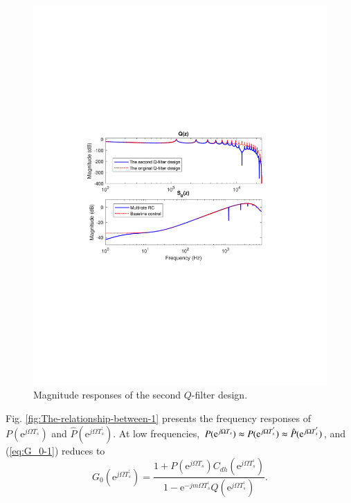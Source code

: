 \documentclass [11pt, proquest] {uwthesis}[2020/02/24]
\begin{document}
\begin{figure}[!ht]
\begin{centering}
\includegraphics[width=12cm]{Fractional-order-RC/Q_S_another_Q}
\par\end{centering}
\caption{\label{fig:Magnitude-responses-of}Magnitude responses of the second
$Q$-filter design.}
\end{figure}
Fig. \ref{fig:The-relationship-between-1} presents the frequency
responses of $P(\text{e}^{j\Omega T_{s}})$ and $\hat{P}(\text{e}^{j\Omega T_{s}^{'}}).$
At low frequencies, $P(\text{e}^{j\Omega T_{s}})\thickapprox P(\text{e}^{j\Omega T_{s}^{'}})\thickapprox\hat{P}(\text{e}^{j\Omega T_{s}^{'}})$,
and (\ref{eq:G_0-1}) reduces to
\begin{equation}
G_{0}(\text{e}^{j\Omega T_{s}^{'}})=\frac{1+P(\text{e}^{j\Omega T_{s}})C_{dh}(\text{e}^{j\Omega T_{s}^{'}})}{1-\text{e}^{-jm\Omega T_{s}^{'}}Q(\text{e}^{j\Omega T_{s}^{'}})}.\label{eq:G_0_low}
\end{equation}
\end{document}
